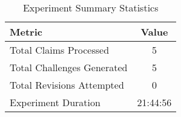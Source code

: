 
\begin{table}[htbp]
\centering
\caption{Experiment Summary Statistics}
\label{tab:experiment_summary}
\begin{tabular}{|l|c|}
\hline
\textbf{Metric} & \textbf{Value} \\
\hline
Total Claims Processed & 5 \\
Total Challenges Generated & 5 \\
Total Revisions Attempted & 0 \\
Experiment Duration & 21:44:56 \\
\hline
\end{tabular}
\end{table}
